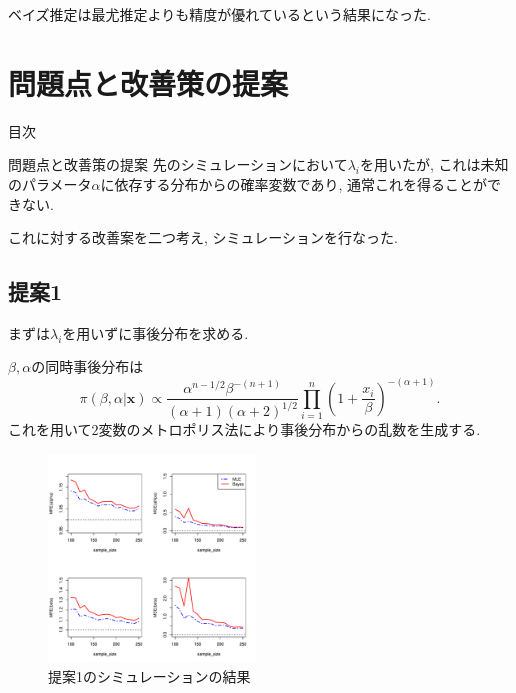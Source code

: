\documentclass[12pt,dvipdfmx]{beamer}
\begin{document}
\begin{frame}
ベイズ推定は最尤推定よりも精度が優れているという結果になった. 
\end{frame}

\section{問題点と改善策の提案}
\begin{frame}
{\large 目次}
\tableofcontents[currentsection]
\end{frame}

\begin{frame}{問題点と改善策の提案}
先のシミュレーションにおいて$\lambda_{i}$を用いたが, これは未知のパラメータ$\alpha$に依存する分布からの確率変数であり, 通常これを得ることができない. 

これに対する改善案を二つ考え, シミュレーションを行なった. 
\end{frame}


\subsection{提案1}
\begin{frame}
まずは$\lambda_{i}$を用いずに事後分布を求める.

$\beta,\alpha$の同時事後分布は
$$
\pi(\beta ,\alpha |\bm{x})
\propto
\frac{\alpha^{n-1/2}\beta ^{-(n+1)}}{(\alpha +1)(\alpha +2)^{1/2}}
\prod_{i=1}^{n}
\left(1+\frac{x_{i}}{\beta }
\right)^{-(\alpha +1)}.
$$
これを用いて$2$変数のメトロポリス法により事後分布からの乱数を生成する. 
\end{frame}

\begin{frame}
\begin{figure}[ht]
\begin{center}
\includegraphics[width=55mm]{notlambda}
\caption{提案1のシミュレーションの結果}
\end{center}
\end{figure}
\end{frame}
\end{document}
